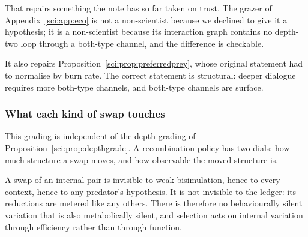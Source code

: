 That repairs something the note has so far taken on trust. The grazer of Appendix~\ref{sci:app:eco} is not
a non-scientist because we declined to give it a hypothesis; it is a non-scientist because its
interaction graph contains no depth-two loop through a both-type channel, and the difference is
checkable.

It also repairs Proposition~\ref{sci:prop:preferredprey}, whose original statement had to normalise by
burn rate. The correct statement is structural: deeper dialogue requires more both-type channels,
and both-type channels are surface.

\subsubsection*{What each kind of swap touches}

\begin{table}[h]
\centering
{}
\caption{The classification says which discipline applies where. Only internal and both-type channels
host pairs at all; external material consists of primes whose counterpart lies in the environment, so
it is swappable singly without orphaning anything --- at the price that its viability is a bet about
the environment rather than a fact about the genome.}
\label{sci:tab:swaptypes}
\end{table}

This grading is independent of the depth grading of Proposition~\ref{sci:prop:depthgrade}. A recombination
policy has two dials: how much structure a swap moves, and how observable the moved structure is.

\begin{proposition}
\label{sci:prop:noneutral}
A swap of an internal pair is invisible to weak bisimulation, hence to every context, hence to any
predator's hypothesis. It is not invisible to the ledger: its reductions are metered like any others.
There is therefore no behaviourally silent variation that is also metabolically silent, and selection
acts on internal variation through efficiency rather than through function.
\end{proposition}

